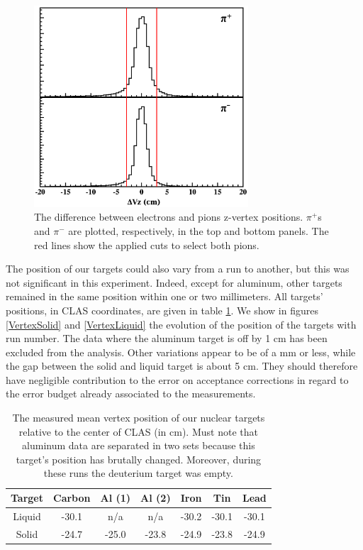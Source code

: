 \begin{figure}[tbp]
\centering
\includegraphics[width=8cm] {chap5-fig/Vertex_pi_data.png}
\caption {The difference between electrons and pions z-vertex positions. $\pi^+$s and $\pi^-$ are plotted, respectively, in the top and bottom panels. The red lines show the applied cuts to select both pions.}
\label{fig:dvzpi}
\end{figure}

The position of our targets could also vary from a run to another, but this was not significant in this experiment. Indeed, except for aluminum, other targets remained in the same position within one or two millimeters. All targets' positions, in CLAS coordinates, are given in table \ref{tab:targets}. 
We show in figures \ref{VertexSolid} and \ref{VertexLiquid} the evolution 
of the position of the targets with run number. The data where the aluminum
target is off by 1 cm has been excluded from the analysis. Other variations
appear to be of a mm or less, while the gap between the solid and liquid target
is about 5 cm. They should therefore have negligible contribution to the 
error on acceptance corrections in regard to the error budget already associated
to the measurements.

\begin{table}[p]
  \centering
  \begin{tabular}{|c|c|c|c|c|c|c|}
    \hline
    Target & Carbon & Al (1) & Al (2) & Iron   & Tin    & Lead   \\ 
    \hline \hline
    Liquid & -30.1  & n/a    & n/a    & -30.2  & -30.1  & -30.1  \\ 
    Solid  & -24.7  & -25.0  & -23.8  & -24.9  & -23.8  & -24.9  \\
    \hline
  \end{tabular}
  \caption{The measured mean vertex position of our nuclear targets relative to the center of CLAS (in cm). Must note that aluminum data are separated in two sets because this target's position has brutally changed. Moreover, during these runs the deuterium target was empty.}
  \label{tab:targets}
\end{table}

